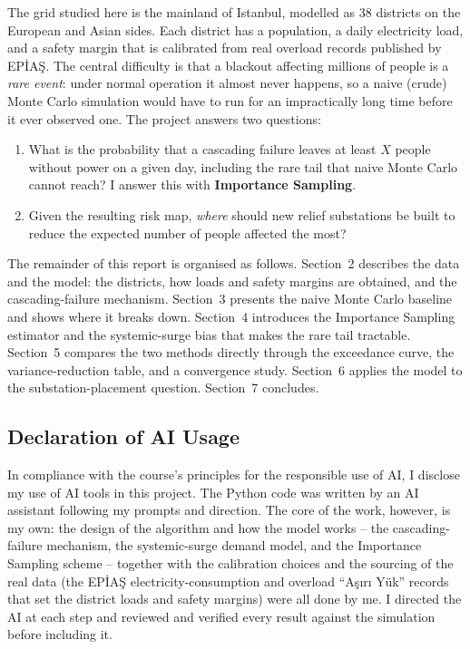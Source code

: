 \documentclass[11pt,a4paper]{article}
\begin{document}
The grid studied here is the mainland of Istanbul, modelled as 38 districts on
the European and Asian sides. Each district has a population, a daily
electricity load, and a safety margin that is calibrated from real overload
records published by EPİAŞ. The central difficulty is that a blackout affecting
millions of people is a \emph{rare event}: under normal operation it almost never
happens, so a naive (crude) Monte Carlo simulation would have to run for an
impractically long time before it ever observed one. The project answers two
questions:

\begin{enumerate}
    \item What is the probability that a cascading failure leaves at least $X$
    people without power on a given day, including the rare tail that naive
    Monte Carlo cannot reach? I answer this with \textbf{Importance Sampling}.
    \item Given the resulting risk map, \emph{where} should new relief
    substations be built to reduce the expected number of people affected the
    most?
\end{enumerate}

The remainder of this report is organised as follows. Section~2 describes the
data and the model: the districts, how loads and safety margins are obtained,
and the cascading-failure mechanism. Section~3 presents the naive Monte Carlo
baseline and shows where it breaks down. Section~4 introduces the Importance
Sampling estimator and the systemic-surge bias that makes the rare tail
tractable. Section~5 compares the two methods directly through the exceedance
curve, the variance-reduction table, and a convergence study. Section~6 applies
the model to the substation-placement question. Section~7 concludes.

\subsection*{Declaration of AI Usage}

In compliance with the course's principles for the responsible use of AI, I
disclose my use of AI tools in this project. The Python code was written by an AI
assistant following my prompts and direction. The core of the work, however, is
my own: the design of the algorithm and how the model works -- the
cascading-failure mechanism, the systemic-surge demand model, and the Importance
Sampling scheme -- together with the calibration choices and the sourcing of the
real data (the EPİAŞ electricity-consumption and overload ``Aşırı Yük'' records
that set the district loads and safety margins) were all done by me. I directed
the AI at each step and reviewed and verified every result against the
simulation before including it.
\end{document}
